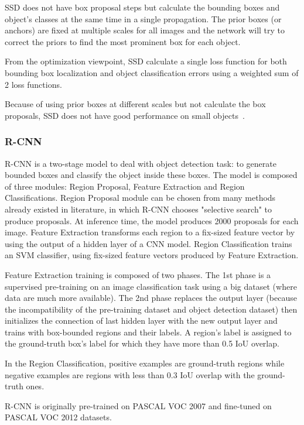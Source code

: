 \documentclass[conference]{IEEEtran}
\begin{document}
SSD does not have box proposal steps but calculate the bounding boxes and object's classes at the same time in a single propagation. The prior boxes (or anchors) are fixed at multiple scales for all images and the network will try to correct the priors to find the most prominent box for each object.

From the optimization viewpoint, SSD calculate a single loss function for both bounding box localization and object classification errors using a weighted sum of 2 loss functions. 

Because of using prior boxes at different scales but not calculate the box proposals, SSD does not have good performance on small objects~\cite{liu2016ssd}.


\subsubsection{R-CNN }
R-CNN is a two-stage model to deal with object detection task: to generate bounded boxes and classify the object inside these boxes. The model is composed of three modules: Region Proposal, Feature Extraction and Region Classifications. Region Proposal module can be chosen from many methods already existed in literature, in which R-CNN chooses "selective search" to produce proposals. At inference time, the model produces 2000 proposals for each image. Feature Extraction transforms each region to a fix-sized feature vector by using the output of a hidden layer of a CNN model. Region Classification trains an SVM classifier, using fix-sized feature vectors produced by Feature Extraction.

Feature Extraction training is composed of two phases. The 1st phase is a supervised pre-training on an image classification task using a big dataset (where data are much more available). The 2nd phase replaces the output layer (because the incompatibility of the pre-training dataset and object detection dataset) then initializes the connection of last hidden layer with the new output layer and trains with box-bounded regions and their labels. A region's label is assigned to the ground-truth box's label for which they have more than 0.5 IoU overlap.

In the Region Classification, positive examples are ground-truth regions while negative examples are regions with less than 0.3 IoU overlap with the ground-truth ones.

R-CNN is originally pre-trained on PASCAL VOC 2007 and fine-tuned on PASCAL VOC 2012 datasets. 
\end{document}
